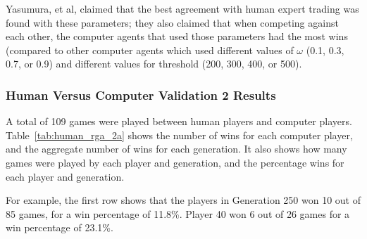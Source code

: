 Yasumura, et al, claimed that the best agreement with human expert trading was
found with these parameters; they also claimed that when competing against each
other, the computer agents that used those parameters had the most wins
(compared to other computer agents which used different values of \(\omega\)
(0.1, 0.3, 0.7, or 0.9) and different values for threshold (200, 300, 400, or
500).

\subsubsection{Human Versus Computer Validation 2 Results}

A total of 109 games were played between human players and computer players.
Table~\ref{tab:human_rga_2a} shows the number of wins for each computer player,
and the aggregate number of wins for each generation. It also shows how many
games were played by each player and generation, and the percentage wins for
each player and generation.

For example, the first row shows that the players in Generation 250 won 10 out
of 85 games, for a win percentage of 11.8\%. Player 40 won 6 out of 26 games for
a win percentage of 23.1\%.


